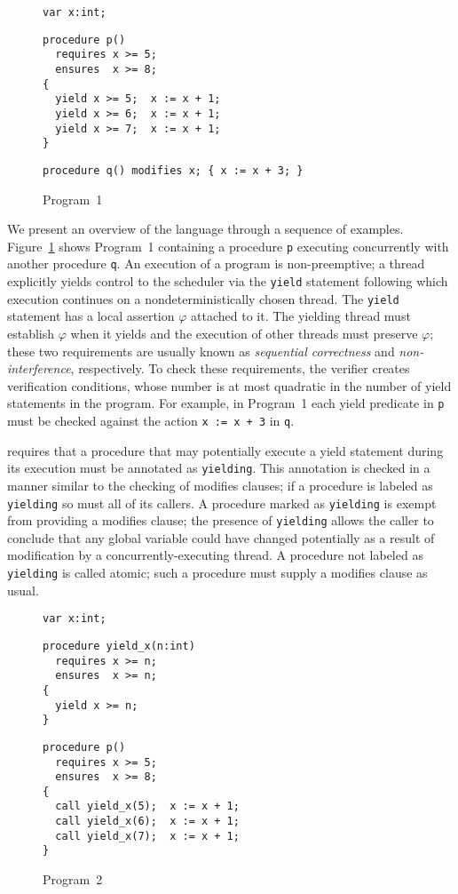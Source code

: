 \begin{figure}
\begin{verbatim}
var x:int;
\end{verbatim}
\begin{verbatim}
procedure p()
  requires x >= 5;
  ensures  x >= 8;
{
  yield x >= 5;  x := x + 1;
  yield x >= 6;  x := x + 1;
  yield x >= 7;  x := x + 1;
}
\end{verbatim}
\begin{verbatim}
procedure q() modifies x; { x := x + 3; }
\end{verbatim}
\caption{Program~1}
\label{fig:ex1}
\end{figure}

We present an overview of the \civl language through a sequence of examples.
Figure~\ref{fig:ex1} shows Program~1 containing a procedure {\tt p}
executing concurrently with another procedure {\tt q}. 
An execution of a \civl program is non-preemptive; a thread explicitly yields control to the
scheduler via the {\tt yield} statement following which execution continues on a 
nondeterministically chosen thread.
The {\tt yield} statement has a local assertion $\varphi$ attached to it.
The yielding thread must establish $\varphi$ when it yields and the execution of other threads 
must preserve $\varphi$; these two requirements are usually known as {\em sequential correctness}
and {\em non-interference}, respectively.
To check these requirements, the \civl verifier creates verification conditions, whose number is at most
quadratic in the number of yield statements in the program.
For example, in Program~1 each yield predicate in {\tt p} must be checked against the action 
{\tt x := x + 3} in {\tt q}.

\civl requires that a procedure that may potentially execute a yield statement during its execution 
must be annotated as {\tt yielding}.
This annotation is checked in a manner similar to the checking of modifies clauses; if a procedure is labeled 
as {\tt yielding} so must all of its callers.
A procedure marked as {\tt yielding} is exempt from providing a modifies clause; 
the presence of {\tt yielding} allows the caller to conclude that any global variable could have changed
potentially as a result of modification by a concurrently-executing thread.
A procedure not labeled as {\tt yielding} is called atomic; such a procedure must supply a modifies clause as usual.

\begin{figure}
\begin{verbatim}
var x:int;
\end{verbatim}
\begin{verbatim}
procedure yield_x(n:int)
  requires x >= n;
  ensures  x >= n;
{
  yield x >= n;
}
\end{verbatim}
\begin{verbatim}
procedure p()
  requires x >= 5;
  ensures  x >= 8;
{
  call yield_x(5);  x := x + 1;
  call yield_x(6);  x := x + 1;
  call yield_x(7);  x := x + 1;
}
\end{verbatim}
\caption{Program~2}
\label{fig:ex2}
\end{figure}

